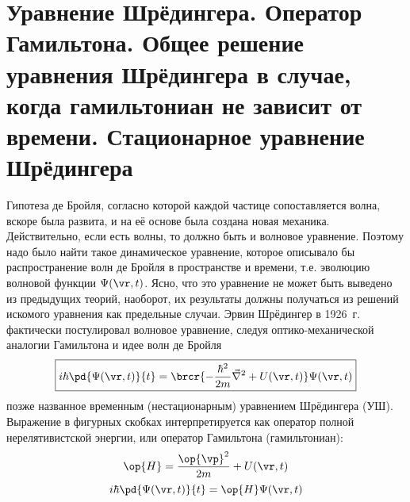 \begin{sloppypar}
  \section{Уравнение Шрёдингера. Оператор Гамильтона. Общее решение уравнения Шрёдингера в случае, когда гамильтониан не зависит от времени. Стационарное уравнение Шрёдингера}
\end{sloppypar}

Гипотеза де Бройля, согласно которой каждой частице сопоставляется волна, вскоре была развита, и на её основе была создана новая механика. Действительно, если есть волны, то должно быть и волновое уравнение. Поэтому надо было найти такое динамическое уравнение, которое описывало бы распространение волн де Бройля в пространстве и времени, т.е. эволюцию волновой функции $\Psi(\vr, t)$. Ясно, что это уравнение не может быть выведено из предыдущих теорий, наоборот, их результаты должны получаться из решений искомого уравнения как предельные случаи. Эрвин Шрёдингер в 1926~г. фактически постулировал волновое уравнение, следуя оптико-механической аналогии Гамильтона и идее волн де Бройля
\begin{equation}
\label{eq:1_3_1}
\boxed{
  i \hbar \pd{\Psi(\vr,t)}{t} =
    \brcr{-\frac{\hbar^2}{2m}\vec{\nabla}^2 + U(\vr,t)} \Psi(\vr,t)
} 
\end{equation}%
%
позже названное временным (нестационарным) уравнением Шрёдингера (УШ). Выражение в фигурных скобках интерпретируется как оператор полной нерелятивистской энергии, или оператор Гамильтона (гамильтониан):
$$
\op{H} = \frac{\op{\vp}^2}{2m} + U(\vr,t)
$$
\begin{equation}
\label{eq:1_3_2}
i \hbar \pd{\Psi(\vr,t)}{t} = \op{H} \Psi(\vr,t)
\end{equation}

